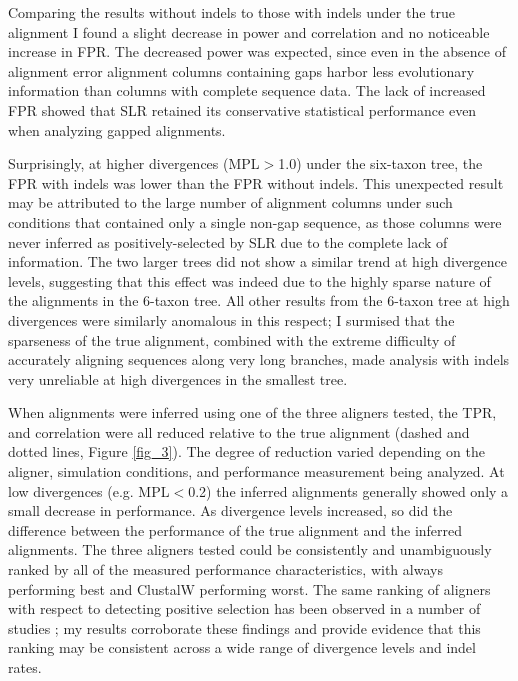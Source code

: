 Comparing the results without indels to those with indels under the
true alignment I found a slight decrease in power and \omg
correlation and no noticeable increase in FPR. The decreased power was
expected, since even in the absence of alignment error alignment
columns containing gaps harbor less evolutionary information than
columns with complete sequence data. The lack of increased FPR showed
that SLR retained its conservative statistical performance even when
analyzing gapped alignments.

Surprisingly, at higher divergences (MPL$>$1.0)
under the six-taxon tree, the FPR with indels was lower than the FPR
without indels. This unexpected result may be attributed to the large
number of alignment columns under such conditions that contained only
a single non-gap sequence, as those columns were never inferred as
positively-selected by SLR due to the complete lack of
information. The two larger trees did not show a similar trend at high
divergence levels, suggesting that this effect was indeed due to the
highly sparse nature of the alignments in the 6-taxon tree. All other
results from the 6-taxon tree at high divergences were similarly
anomalous in this respect; I surmised that the sparseness of the true
alignment, combined with the extreme difficulty of accurately aligning
sequences along very long branches, made \sw analysis with indels very
unreliable at high divergences in the smallest tree.

When alignments were inferred using one of the three aligners tested,
the TPR, \tpr{} and \omg correlation were all reduced relative to
the true alignment (dashed and dotted lines, Figure \ref{fig_3}). The
degree of reduction varied depending on the aligner, simulation
conditions, and performance measurement being analyzed. At low
divergences (e.g. MPL$<$0.2) the inferred alignments generally
showed only a small decrease in performance. As divergence levels
increased, so did the difference between the performance of the true
alignment and the inferred alignments. The three aligners tested could
be consistently and unambiguously ranked by all of the measured
performance characteristics, with \prankc always performing best and
ClustalW performing worst. The same ranking of aligners with respect
to detecting positive selection has been observed in a number of
studies
\citep{Fletcher2010,MarkovaRaina2011,Privman2011Improving};
my results corroborate these findings and provide evidence that this
ranking may be consistent across a wide range of divergence levels and
indel rates.

